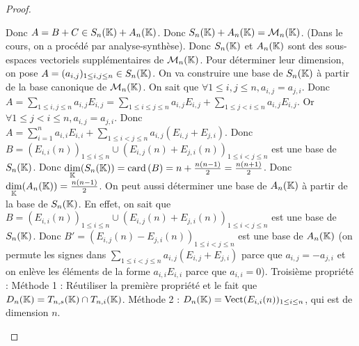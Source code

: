 \documentclass[12pt,a4paper]{report}
\begin{document}
\begin{proof}
\begin{outline}
            \3 Donc $A = B + C \in S_n(\mathbb{K}) + A_n(\mathbb{K})$.
            \3 Donc $S_n(\mathbb{K}) + A_n(\mathbb{K}) = \mathcal M_n(\mathbb{K})$. (Dans le cours, on a procédé par analyse-synthèse).
            \2 Donc $S_n(\mathbb{K})$ et $A_n(\mathbb{K})$ sont des sous-espaces vectoriels supplémentaires de $\mathcal M_n(\mathbb{K})$.
            \2 Pour déterminer leur dimension, on pose $A = (a_{i,j})_{1 \le i,j \le n} \in S_n(\mathbb{K})$.
            \2 On va construire une base de $S_n(\mathbb{K})$ à partir de la base canonique de $\mathcal M_n(\mathbb{K})$.
            \3 On sait que $\forall 1 \le i,j \le n, a_{i,j} = a_{j,i}$.
            \3 Donc $A = \sum_{1 \le i,j \le n} a_{i,j} E_{i,j} = \sum_{1 \le i \le j \le n} a_{i,j} E_{i,j} + \sum_{1 \le j < i \le n} a_{i,j} E_{i,j}$.
            \3 Or $\forall 1 \le j < i \le n, a_{i,j} = a_{j,i}$.
            \3 Donc $A = \sum_{i=1}^n a_{i,i} E_{i,i} + \sum_{1 \le i < j \le n} a_{i,j} (E_{i,j} + E_{j,i})$.
            \3 Donc $B = (E_{i,i}(n))_{1 \le i \le n} \cup (E_{i,j}(n) + E_{j,i}(n))_{1 \le i < j \le n}$ est une base de $S_n(\mathbb{K})$.
            \2 Donc $\underset{\mathbb{K}}\dim(S_n(\mathbb{K})) = \mathrm{card}\left(B\right) = n + \frac{n(n-1)}{2} = \frac{n(n+1)}{2}$.
            \2 Donc $\underset{\mathbb{K}}\dim(A_n(\mathbb{K})) = \frac{n(n-1)}{2}$.
            \3 On peut aussi déterminer une base de $A_n(\mathbb{K})$ à partir de la base de $S_n(\mathbb{K})$.
            \3 En effet, on sait que $B = (E_{i,i}(n))_{1 \le i \le n} \cup (E_{i,j}(n) + E_{j,i}(n))_{1 \le i < j \le n}$ est une base de $S_n(\mathbb{K})$.
            \3 Donc $B' = (E_{i,j}(n) - E_{j,i}(n))_{1 \le i < j \le n}$ est une base de $A_n(\mathbb{K})$ (on permute les signes dans $\sum_{1 \le i < j \le n} a_{i,j} (E_{i,j} + E_{j,i})$ parce que $a_{i,j} = -a_{j,i}$ et on enlève les éléments de la forme $a_{i,i} E_{i,i}$ parce que $a_{i,i} = 0$).
        \1 Troisième propriété :
            \2 Méthode 1 : Réutiliser la première propriété et le fait que $D_n(\mathbb{K}) = T_{n,s}(\mathbb{K}) \cap T_{n,i}(\mathbb{K})$.
            \2 Méthode 2 : $D_n(\mathbb{K}) = \mathrm{Vect}(E_{i,i}(n))_{1 \le i \le n}$, qui est de dimension $n$.
    \end{outline}
\end{proof}
\end{document}
